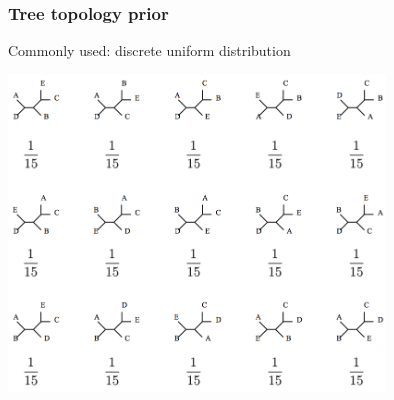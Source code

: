 \begin{frame}
\frametitle{Tree topology prior}

\small{Commonly used: discrete uniform distribution}

\smallskip{}

\begin{centering}

\includegraphics[width=0.75\textwidth]{../images/treeTopologyPrior}

\end{centering}

\end{frame}

